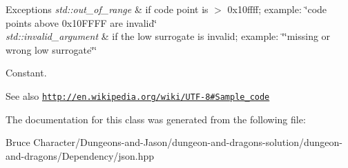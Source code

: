 \begin{DoxyExceptions}{Exceptions}
{\em std\+::out\+\_\+of\+\_\+range} & if code point is $>$ 0x10ffff; example\+: {\ttfamily \char`\"{}code
points above 0x10\+F\+F\+F\+F are invalid\char`\"{}} \\
\hline
{\em std\+::invalid\+\_\+argument} & if the low surrogate is invalid; example\+: {\ttfamily \char`\"{}\char`\"{}missing or wrong low surrogate\char`\"{}\char`\"{}}\\
\hline
\end{DoxyExceptions}
Constant.

\begin{DoxySeeAlso}{See also}
\href{http://en.wikipedia.org/wiki/UTF-8#Sample_code}{\tt http\+://en.\+wikipedia.\+org/wiki/\+U\+T\+F-\/8\#\+Sample\+\_\+code} 
\end{DoxySeeAlso}


The documentation for this class was generated from the following file\+:\begin{DoxyCompactItemize}
\item 
Bruce Character/\+Dungeons-\/and-\/\+Jason/dungeon-\/and-\/dragons-\/solution/dungeon-\/and-\/dragons/\+Dependency/json.\+hpp\end{DoxyCompactItemize}
